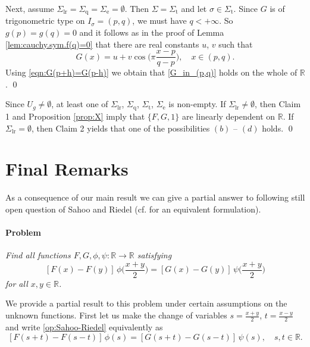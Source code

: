 \documentclass{birkjour}
\begin{document}
Next, assume $\Sigma_{\textrm{lr}} = \Sigma_{\textrm{q}} = \Sigma_{\textrm{e}} = \emptyset$. Then $\Sigma = \Sigma_{\textrm{t}}$ and let $\sigma\in\Sigma_{\textrm{t}}$. Since $G$ is of trigonometric type on $I_{\sigma}=(p,q)$, we must have $q<+\infty$. So $g(p)=g(q)=0$ and it follows as in the proof of Lemma \ref{lem:cauchy.sym.f(q)=0} that there are real constants $u$, $v$ such that  
\begin{equation}\label{G_in_(p,q)}
G(x) = u+v\cos\bigl(\pi\frac{x-p}{q-p}\bigr), \quad x\in (p,q).
\end{equation}
Using \eqref{eqn:G(p+h)=G(p-h)} we obtain that \eqref{G_in_(p,q)} holds on the whole of ${{\mathbb R}}$. \qed

Since $U_g\neq\emptyset$, at least one of $\Sigma_{\textrm{lr}}$, $\Sigma_{\textrm{q}}$, $\Sigma_{\textrm{t}}$, $\Sigma_{\textrm{e}}$ is non-empty. If $\Sigma_{\textrm{lr}} \neq \emptyset$, then Claim 1 and Proposition \ref{prop:X} imply that $\{F, G, 1\}$ are linearly dependent on ${{\mathbb R}}$. If $\Sigma_{\textrm{lr}} = \emptyset$, then Claim 2 yields that one of the possibilities $(b)$ -- $(d)$ holds. \qed

\section{Final Remarks}

As a consequence of our main result we can give a partial answer to following  still open question of Sahoo and Riedel (cf. \cite[Section 2.7]{Sahoo-Riedel} for an equivalent formulation). 

\smallskip

\paragraph{Problem} \textit{Find all functions $F,G,\phi,\psi:{{\mathbb R}} \to {{\mathbb R}}$ satisfying 
\begin{equation}
\label{op:Sahoo-Riedel}
[F(x)-F(y)]\,\phi\bigl(\frac{x+y}{2}\bigr) = [G(x)-G(y)]\,\psi\bigl(\frac{x+y}{2}\bigr) 
\end{equation}
for all $x,y\in{{\mathbb R}}$.}

We provide a partial result to this problem under certain assumptions on the unknown functions. First let us make the change of variables $s=\frac{x+y}{2}$, $t=\frac{x-y}{2}$ and write \eqref{op:Sahoo-Riedel} equivalently as
\begin{equation}
\label{op:Sahoo-Riedel1}
[F(s+t)-F(s-t)]\,\phi(s) = [G(s+t)-G(s-t)]\,\psi(s), \quad s,t\in{{\mathbb R}}.
\end{equation}
\end{document}
